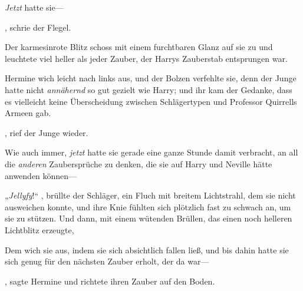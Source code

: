 \emph{Jetzt} hatte sie—

, schrie der Flegel.

Der karmesinrote Blitz schoss mit einem furchtbaren Glanz auf sie zu und leuchtete viel heller als jeder Zauber, der Harrys Zauberstab entsprungen war.

Hermine wich leicht nach links aus, und der Bolzen verfehlte sie, denn der Junge hatte nicht \emph{annähernd} so gut gezielt wie Harry; und ihr kam der Gedanke, dass es vielleicht keine Überscheidung zwischen Schlägertypen und Professor Quirrells Armeen gab.

, rief der Junge wieder. 

Wie auch immer, \emph{jetzt} hatte sie gerade eine ganze Stunde damit verbracht, an all die \emph{anderen} Zaubersprüche zu denken, die sie auf Harry und Neville hätte anwenden können—

„\emph{Jellyfy}!“ , brüllte der Schläger, ein Fluch mit breitem Lichtstrahl, dem sie nicht ausweichen konnte, und ihre Knie fühlten sich plötzlich fast zu schwach an, um sie zu stützen. Und dann, mit einem wütenden Brüllen, das einen noch helleren Lichtblitz erzeugte, 

Dem wich sie aus, indem sie sich absichtlich fallen ließ, und bis dahin hatte sie sich genug für den nächsten Zauber erholt, der da war—

, sagte Hermine und richtete ihren Zauber auf den Boden.

